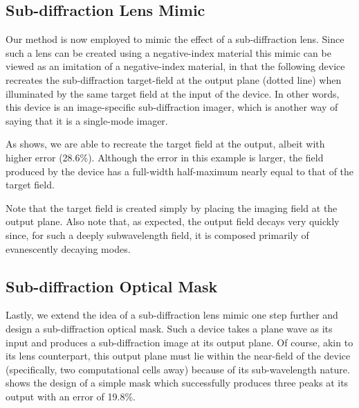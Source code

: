 \subsection{Sub-diffraction Lens Mimic}

Our method is now employed to mimic the effect of a sub-diffraction lens.
Since such a lens can be created using a negative-index material \cite{Pendry00}
    this mimic can be viewed as an imitation of a negative-index material,
    in that the following device recreates the sub-diffraction target-field 
    at the output plane (dotted line)
    when illuminated by the same target field at the input of the device.
In other words,
    this device is an image-specific sub-diffraction imager,
    which is another way of saying that it is a single-mode imager.

As  shows,
   we are able to recreate the target field at the output,
   albeit with higher error (28.6\%).
Although the error in this example is larger,
    the field produced by the device has a full-width half-maximum
    nearly equal to that of the target field.

Note that the target field is created simply by placing 
    the imaging field at the output plane.
Also note that, as expected, 
    the output field decays very quickly since,
    for such a deeply subwavelength field,
    it is composed primarily of evanescently decaying modes.



\subsection{Sub-diffraction Optical Mask}

Lastly, we extend the idea of a sub-diffraction lens mimic
    one step further and
    design a sub-diffraction optical mask.
Such a device takes a plane wave as its input and
    produces a sub-diffraction image at its output plane.
Of course, akin to its lens counterpart,
    this output plane must lie within the near-field 
    of the device (specifically, two computational cells away)
    because of its sub-wavelength nature.
     shows the design of a simple mask which 
    successfully produces three peaks at its output
    with an error of 19.8\%.
    
 
